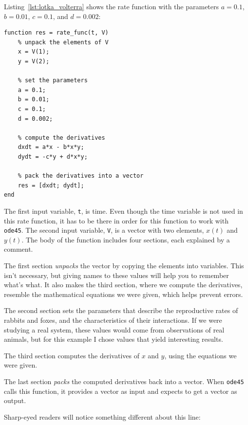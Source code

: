 
Listing~\ref{lst:lotka_volterra} shows the rate function
with the parameters $a = 0.1$, $b = 0.01$, $c = 0.1$, and $d = 0.002$:

\begin{lstlisting}[caption={A rate function for Lotka-Volterra}, label={lst:lotka_volterra}]
function res = rate_func(t, V)
    % unpack the elements of V
    x = V(1);
    y = V(2);

    % set the parameters
    a = 0.1;
    b = 0.01;
    c = 0.1;
    d = 0.002;

    % compute the derivatives
    dxdt = a*x - b*x*y;
    dydt = -c*y + d*x*y;

    % pack the derivatives into a vector
    res = [dxdt; dydt];
end
\end{lstlisting}

The first input variable, \lstinline{t}, is time.
Even though the time variable is not used in this rate function,
it has to be there in order for this function to work with \lstinline{ode45}.
The second input variable, \lstinline{V}, is a vector with two elements,
$x(t)$ and $y(t)$.
The body of the function includes four sections, each explained by a comment.

The first section \emph{unpacks} the vector by copying the elements
into variables.  This isn't necessary, but giving names to
these values will help you to remember what's what.  It also makes the third
section, where we compute the derivatives, resemble the mathematical
equations we were given, which helps prevent errors.


The second section sets the parameters that describe the
reproductive rates of rabbits and foxes, and the characteristics of
their interactions.  If we were studying a real system, these values
would come from observations of real animals, but for this example
I chose values that yield interesting results.


The third section computes the derivatives of $x$ and $y$, using the equations
we were given.

The last section \emph{packs} the computed derivatives back into a
vector.  When \lstinline{ode45} calls this function, it provides a vector
as input and expects to get a vector as output.

Sharp-eyed readers will notice something different about this line:

